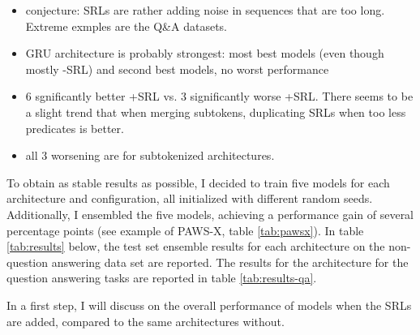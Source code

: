 \begin{itemize}
  \item conjecture: SRLs are rather adding noise in sequences that are too long. Extreme exmples are the Q\&A datasets.
  \item GRU architecture is probably strongest: most best models (even though mostly -SRL) and second best models, no worst performance
  \item 6 sgnificantly better +SRL vs. 3 significantly worse +SRL. There seems to be a slight trend that when merging subtokens, duplicating SRLs when too less predicates is better.
  \item all 3 worsening are for subtokenized architectures.
\end{itemize}

To obtain as stable results as possible, I decided to train five models for each architecture
and configuration, all initialized with different random seeds. Additionally, I ensembled the
five models, achieving a performance gain of several percentage points (see example of PAWS-X,
table \ref{tab:pawsx}). In table \ref{tab:results} below, the test set ensemble results for
each architecture on the non-question answering data set are reported. The results for the
architecture for the question answering tasks are reported in table \ref{tab:results-qa}.

In a first step, I will discuss on the overall performance of models when the SRLs are added, compared to the same architectures without.

